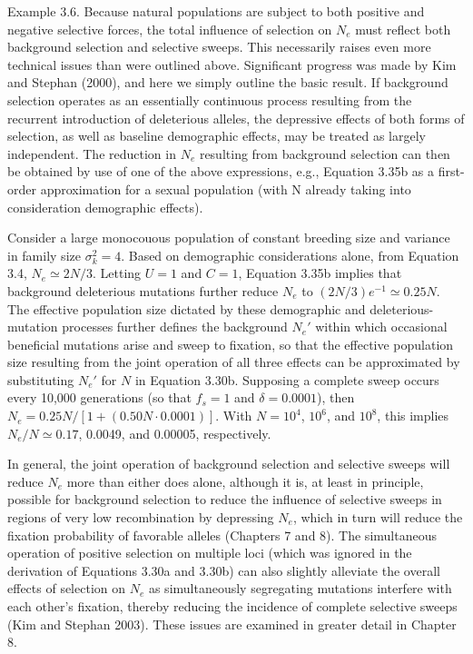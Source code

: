 \documentclass{article}
\begin{document}
Example 3.6. Because natural populations are subject to both positive and negative selective forces, the total influence of selection on  $ N_{e} $ must reflect both background selection and selective sweeps. This necessarily raises even more technical issues than were outlined above. Significant progress was made by Kim and Stephan (2000), and here we simply outline the basic result. If background selection operates as an essentially continuous process resulting from the recurrent introduction of deleterious alleles, the depressive effects of both forms of selection, as well as baseline demographic effects, may be treated as largely independent. The reduction in  $ N_{e} $ resulting from background selection can then be obtained by use of one of the above expressions, e.g., Equation 3.35b as a first-order approximation for a sexual population (with N already taking into consideration demographic effects).

Consider a large monocouous population of constant breeding size and variance in family size  $ \sigma_k^2 = 4 $. Based on demographic considerations alone, from Equation 3.4,  $ N_e \simeq 2N/3 $. Letting  $ U = 1 $ and  $ C = 1 $, Equation 3.35b implies that background deleterious mutations further reduce  $ N_e $ to  $ (2N/3)e^{-1} \simeq 0.25N $. The effective population size dictated by these demographic and deleterious-mutation processes further defines the background  $ N_e' $ within which occasional beneficial mutations arise and sweep to fixation, so that the effective population size resulting from the joint operation of all three effects can be approximated by substituting  $ N_e' $ for  $ N $ in Equation 3.30b. Supposing a complete sweep occurs every 10,000 generations (so that  $ f_s = 1 $ and  $ \delta = 0.0001 $), then  $ N_e = 0.25N/[1 + (0.50N \cdot 0.0001)] $. With  $ N = 10^4 $,  $ 10^6 $, and  $ 10^8 $, this implies  $ N_e/N \simeq 0.17 $, 0.0049, and 0.00005, respectively.

In general, the joint operation of background selection and selective sweeps will reduce  $ N_{e} $ more than either does alone, although it is, at least in principle, possible for background selection to reduce the influence of selective sweeps in regions of very low recombination by depressing  $ N_{e} $, which in turn will reduce the fixation probability of favorable alleles (Chapters 7 and 8). The simultaneous operation of positive selection on multiple loci (which was ignored in the derivation of Equations 3.30a and 3.30b) can also slightly alleviate the overall effects of selection on  $ N_{e} $ as simultaneously segregating mutations interfere with each other's fixation, thereby reducing the incidence of complete selective sweeps (Kim and Stephan 2003). These issues are examined in greater detail in Chapter 8.
\end{document}
